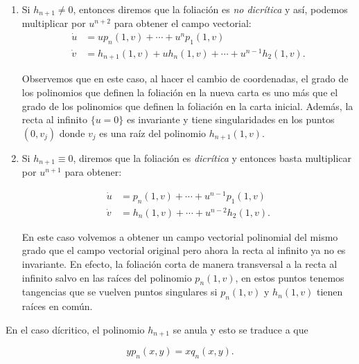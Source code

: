 \begin{enumerate}

\item Si $h_{n+1}\neq 0$, entonces diremos que la foliación es \emph{no dicrítica} y así, podemos multiplicar por $u^{n+2}$ para obtener el campo vectorial:
\begin{equation}
\label{EcuacionNoDicritica}
\begin{aligned}
\dot{u} &=up_{n}(1,v)+\cdots+u^{n}p_{1}(1,v)\\
\dot{v} &=h_{n+1}(1,v)+uh_{n}(1,v)+\cdots+u^{n-1}h_{2}(1,v).
\end{aligned}
\end{equation}

Observemos que en este caso, al hacer el cambio de coordenadas, el grado de los polinomios que definen la foliación en la nueva carta es uno más que el grado de los polinomios que definen la foliación en la carta inicial. Además, la recta al infinito $\{u=0\}$ es invariante y tiene singularidades en los puntos $(0,v_{j})$ donde $v_{j}$ es una raíz del polinomio $h_{n+1}(1,v)$.

\item Si $h_{n+1}\equiv 0$, diremos que la foliación es \emph{dicrítica} y entonces basta multiplicar por $u^{n+1}$ para obtener:

\begin{equation}
\label{EcuacionDicriticaInfinito}
\begin{aligned}
\dot{u} &=p_{n}(1,v)+\cdots+u^{n-1}p_{1}(1,v)\\
\dot{v} &=h_{n}(1,v)+\cdots+u^{n-2}h_{2}(1,v).
\end{aligned}
\end{equation}

En este caso volvemos a obtener un campo vectorial polinomial del mismo grado que el campo vectorial original pero ahora la recta al infinito ya no es invariante. En efecto, la foliación corta de manera transversal a la recta al infinito salvo en las raíces del polinomio $p_{n}(1,v)$, en estos puntos tenemos tangencias que se vuelven puntos singulares si $p_{n}(1,v)$ y $h_{n}(1,v)$ tienen raíces en común.
\end{enumerate}

En el caso dícritico, el polinomio $h_{n+1}$ se anula y esto se traduce a que

\begin{equation}
\label{CondicionDicritica}
yp_{n}(x,y)=xq_{n}(x,y).
\end{equation}

